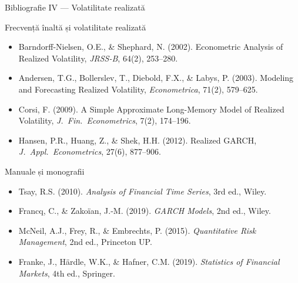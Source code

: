 \documentclass[9pt, aspectratio=169, t]{beamer}
\begin{document}
\begin{frame}{Bibliografie IV --- Volatilitate realizată}
    \small
    \vspace{-0.4cm}
        \begin{block}{Frecvență înaltă și volatilitate realizată}
            \begin{itemize}\setlength{\itemsep}{-1pt}
                \item Barndorff-Nielsen, O.E., \& Shephard, N. (2002). Econometric Analysis of Realized Volatility, \textit{JRSS-B}, 64(2), 253--280.
                \item Andersen, T.G., Bollerslev, T., Diebold, F.X., \& Labys, P. (2003). Modeling and Forecasting Realized Volatility, \textit{Econometrica}, 71(2), 579--625.
                \item Corsi, F. (2009). A Simple Approximate Long-Memory Model of Realized Volatility, \textit{J.\ Fin.\ Econometrics}, 7(2), 174--196.
                \item Hansen, P.R., Huang, Z., \& Shek, H.H. (2012). Realized GARCH, \textit{J.\ Appl.\ Econometrics}, 27(6), 877--906.
            \end{itemize}
        \end{block}
        \vspace{-0.15cm}
        \begin{exampleblock}{Manuale și monografii}
            \begin{itemize}\setlength{\itemsep}{-1pt}
                \item Tsay, R.S. (2010). \textit{Analysis of Financial Time Series}, 3rd ed., Wiley.
                \item Francq, C., \& Zakoïan, J.-M. (2019). \textit{GARCH Models}, 2nd ed., Wiley.
                \item McNeil, A.J., Frey, R., \& Embrechts, P. (2015). \textit{Quantitative Risk Management}, 2nd ed., Princeton UP.
                \item Franke, J., Härdle, W.K., \& Hafner, C.M. (2019). \textit{Statistics of Financial Markets}, 4th ed., Springer.
            \end{itemize}
        \end{exampleblock}
\end{frame}
\end{document}

